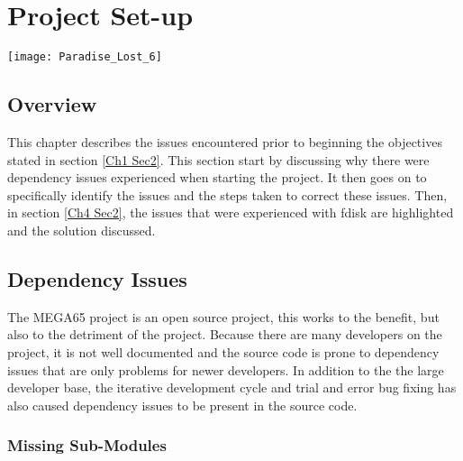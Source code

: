 
\chapter{Project Set-up} %

\label{Chapter 4} %

\texttt{[image: Paradise\_Lost\_6]}

\section{Overview}

This chapter describes the issues encountered prior to beginning the objectives stated in section \ref{Ch1 Sec2}. This section start by discussing why there were dependency issues experienced when starting the project. It then goes on to specifically identify the issues and the steps taken to correct these issues. Then, in section \ref{Ch4 Sec2}, the issues that were experienced with fdisk are highlighted and the solution discussed. 


\section{Dependency Issues}

\label{Ch4 Sec1}

The MEGA65 project is an open source project, this works to the benefit, but also to the detriment of the project. Because there are many developers on the project, it is not well documented and the source code is prone to dependency issues that are only problems for newer developers. In addition to the the large developer base, the iterative development cycle and trial and error bug fixing has also caused dependency issues to be present in the source code.

\subsection{Missing Sub-Modules}

